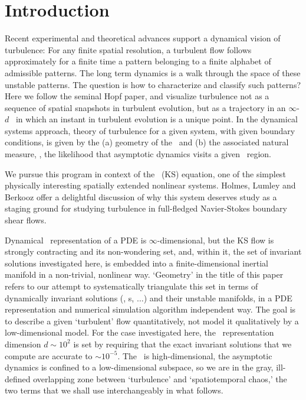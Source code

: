 
\section{Introduction}

Recent experimental and theoretical advances
support a dynamical vision of turbulence:
For any finite  spatial resolution,
a turbulent flow follows approximately for a finite time
a pattern belonging to a
{ finite alphabet}
of admissible patterns.
The long term dynamics is
a {walk through the space of these unstable patterns}.
The question is how to characterize and classify such patterns?
Here we follow the seminal Hopf paper, and  visualize
turbulence not as  a sequence of
spatial snapshots in turbulent evolution,
but as a trajectory in an
 $\infty$-$d$ \statesp\ in which an
instant in turbulent evolution is
a {unique} point. In the dynamical systems approach,
theory of turbulence for a given system, with given boundary conditions,
is given by the
(a) geometry of the \statesp\ and (b) the associated natural measure,
\ie,
the likelihood that asymptotic dynamics visits a given \statesp\ region.

We pursue this program in context of the \KS\ (KS) equation,
one of the simplest physically interesting spatially extended
nonlinear systems.  Holmes, Lumley and Berkooz offer a
delightful discussion of why this system deserves study as a staging
ground for studying turbulence in full-fledged Navier-Stokes
boundary shear flows.

Dynamical \statesp\ representation of a PDE is $\infty$-dimensional,
but the KS flow is strongly contracting and its non-wondering set,
and, within it, the set of invariant solutions investigated here, is
embedded into a finite-dimensional inertial manifold in
a non-trivial, nonlinear way. `Geometry' in the title of this paper
refers to our attempt to systematically triangulate this set in
terms of dynamically invariant solutions (\eqva, \po s, $\ldots$)
and their unstable manifolds, in a PDE representation and numerical simulation algorithm 
independent way. The goal is to describe a given
`turbulent' flow quantitatively, not model it qualitatively by a
low-dimensional model. For the case investigated here, the \statesp\
representation dimension $d \sim 10^2$ is set by requiring that the
exact invariant solutions that we compute are accurate to $\sim
10^{-5}$.
The \statesp\ is high-dimensional, the asymptotic dynamics is
confined to a low-dimensional subspace, so we are in the gray,
ill-defined overlapping zone between `turbulence'
and `spatiotemporal chaos,' the two terms that we shall use
interchangeably in what follows.

